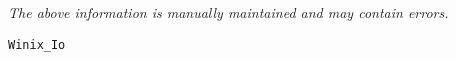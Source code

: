 \label{pkg:winix\_io}

{\tiny \it The above information is manually maintained and may contain errors.}
\begin{verbatim}
Winix_Io
\end{verbatim}
